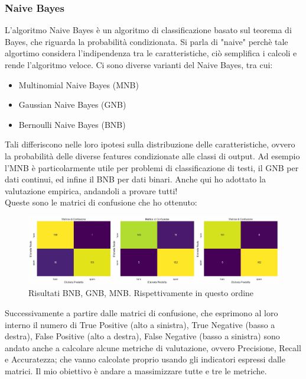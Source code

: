 \documentclass[]{article}
\begin{document}
                \subsubsection{Naive Bayes}
                    L'algoritmo Naive Bayes \cite{wikiNaiveBayes} è un algoritmo di classificazione basato sul teorema di Bayes, che riguarda la probabilità condizionata. Si parla di  "naive" perchè tale algortimo considera l'indipendenza tra le caratteristiche, ciò semplifica i calcoli e rende l'algoritmo veloce. Ci sono diverse varianti del Naive Bayes, tra cui:
                    \begin{itemize}
                        \item Multinomial Naive Bayes (MNB)
                        \item  Gaussian Naive Bayes (GNB)
                        \item Bernoulli Naive Bayes (BNB)
                    \end{itemize}
                    Tali differiscono nelle loro ipotesi sulla distribuzione delle caratteristiche, ovvero la probabilità delle diverse features condizionate alle classi di output. Ad esempio l'MNB è particolarmente utile per problemi di classificazione di testi, il GNB per dati continui, ed infine il BNB per dati binari. Anche qui ho adottato la valutazione empirica, andandoli a provare tutti! \\
                    Queste sono le matrici di confusione che ho ottenuto:
                    \begin{figure}[H]
                        \centering
                        \includegraphics[width=1\linewidth]{images/naiveBayesResults.jpg}
                        \caption{Risultati BNB, GNB, MNB. Rispettivamente in questo ordine}
                        \label{fig:enter-label}
                    \end{figure}
                    Successivamente a partire dalle matrici di confusione, che esprimono al loro interno il numero di True Positive (alto a sinistra), True Negative (basso a destra), False Positive (alto a destra), False Negative (basso a sinistra) sono andato anche a calcolare alcune metriche di valutazione, ovvero Precisione, Recall e Accuratezza; che vanno calcolate proprio usando gli indicatori espressi dalle matrici. Il mio obiettivo è andare a massimizzare tutte e tre le metriche.\\
\end{document}

